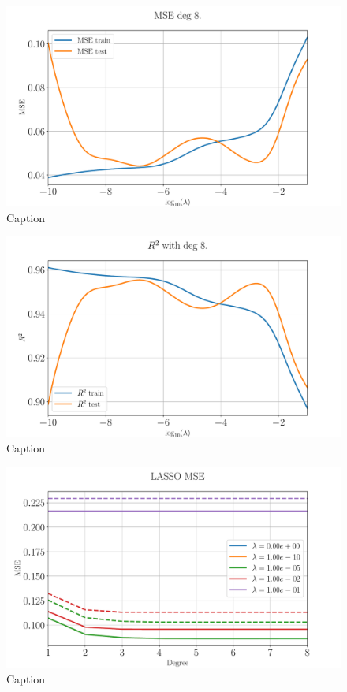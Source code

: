 \documentclass[%
reprint,
amsmath,amssymb,
aps,
pra,
]{revtex4-2}
\begin{document}
\begin{figure}[ht!]
	\centering
	\includegraphics[width=\linewidth]{Python/Figures/Ridge/RIDGE_logMSE_StandardScaling.pdf}
	\caption{Caption}
	\label{fig:ridge_logMSE_degree}
\end{figure}
\begin{figure}[ht!]
	\centering
	\includegraphics[width=\linewidth]{Python/Figures/Ridge/RIDGE_logR2_StandardScaling.pdf}
	\caption{Caption}
	\label{fig:ridge_logR2_degree}
\end{figure}
\begin{figure}[ht!]
	\centering
	\includegraphics[width=\linewidth]{Python/Figures/LASSO/LASSO_MSE_no_scaling.pdf}
	\caption{Caption}
	\label{fig:lasso_mse_degree}
\end{figure}
\end{document}
